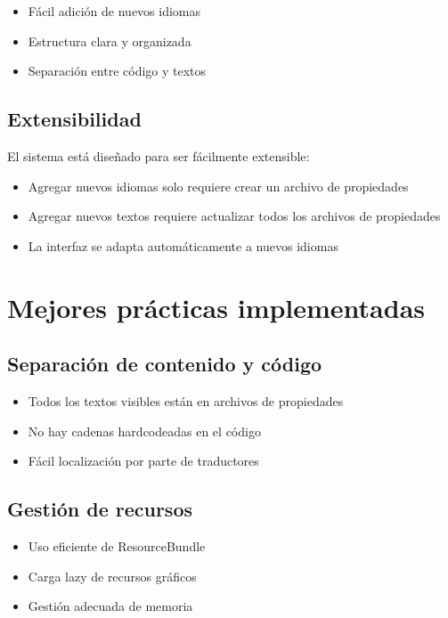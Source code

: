\begin{itemize}
    \item Fácil adición de nuevos idiomas
    \item Estructura clara y organizada
    \item Separación entre código y textos
\end{itemize}

\subsection{Extensibilidad}

El sistema está diseñado para ser fácilmente extensible:

\begin{itemize}
    \item Agregar nuevos idiomas solo requiere crear un archivo de propiedades
    \item Agregar nuevos textos requiere actualizar todos los archivos de propiedades
    \item La interfaz se adapta automáticamente a nuevos idiomas
\end{itemize}

\section{Mejores prácticas implementadas}

\subsection{Separación de contenido y código}

\begin{itemize}
    \item Todos los textos visibles están en archivos de propiedades
    \item No hay cadenas hardcodeadas en el código
    \item Fácil localización por parte de traductores
\end{itemize}

\subsection{Gestión de recursos}

\begin{itemize}
    \item Uso eficiente de ResourceBundle
    \item Carga lazy de recursos gráficos
    \item Gestión adecuada de memoria
\end{itemize}


